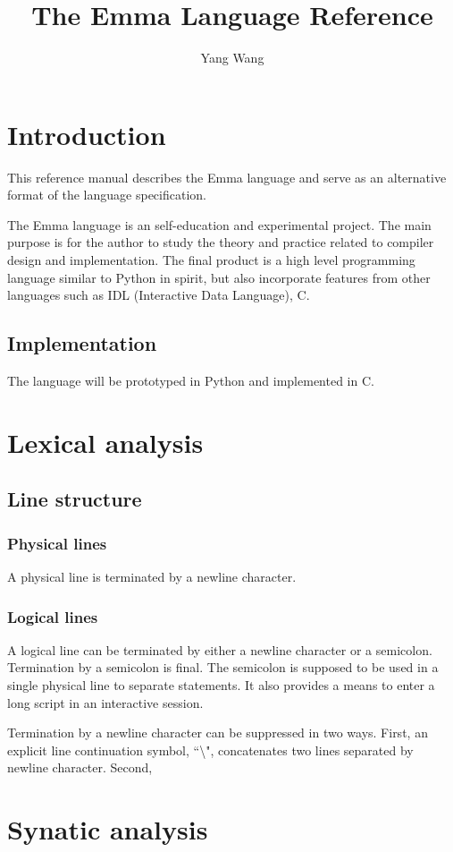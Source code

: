 \documentclass[10pt,a4paper]{article}
\author{Yang Wang}
\title{The Emma Language Reference}
\begin{document}
\section{Introduction}
This reference manual describes the Emma language and serve as an alternative 
format of the language specification.

The Emma language is an self-education and experimental project. 
The main purpose is for the author to study the theory and practice related
to compiler design and implementation. 
The final product is a high level programming language similar to Python in
spirit, but also incorporate features from other languages such as
IDL (Interactive Data Language), C. 

\subsection{Implementation}
The language will be prototyped in Python and implemented in C. 

\section{Lexical analysis}
\subsection{Line structure}


\subsubsection{Physical lines}
A physical line is terminated by a newline character. 

\subsubsection{Logical lines}
A logical line can be terminated by either a newline character or a semicolon.
Termination by a semicolon is final. The semicolon is supposed to be used
in a single physical line to separate statements. It also provides a means
to enter a long script in an interactive session.

Termination by a newline character can be suppressed in two ways.
First, an explicit line continuation symbol, ``\textbackslash", concatenates
two lines separated by newline character. Second, 

\section{Synatic analysis}
\end{document}

